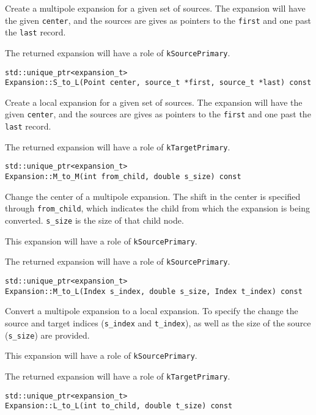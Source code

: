 Create a multipole expansion for a given set of sources. The expansion will
have the given \texttt{center}, and the sources are gives as pointers to the
\texttt{first} and one past the \texttt{last} record.

The returned expansion will have a role of \texttt{kSourcePrimary}.

\begin{lstlisting}
std::unique_ptr<expansion_t> 
Expansion::S_to_L(Point center, source_t *first, source_t *last) const
\end{lstlisting}

Create a local expansion for a given set of sources. The expansion will
have the given \texttt{center}, and the sources are gives as pointers to the
\texttt{first} and one past the \texttt{last} record.

The returned expansion will have a role of \texttt{kTargetPrimary}.

\begin{lstlisting}
std::unique_ptr<expansion_t> 
Expansion::M_to_M(int from_child, double s_size) const
\end{lstlisting}

Change the center of a multipole expansion. The shift in the center is
specified through \texttt{from\_child}, which indicates the child from which
the expansion is being converted. \texttt{s\_size} is the size of that child
node.

This expansion will have a role of \texttt{kSourcePrimary}.

The returned expansion will have a role of \texttt{kSourcePrimary}.

\begin{lstlisting}
std::unique_ptr<expansion_t> 
Expansion::M_to_L(Index s_index, double s_size, Index t_index) const
\end{lstlisting}

Convert a multipole expansion to a local expansion. To specify the change the
source and target indices (\texttt{s\_index} and \texttt{t\_index}), as well
as the size of the source (\texttt{s\_size}) are provided.

This expansion will have a role of \texttt{kSourcePrimary}.

The returned expansion will have a role of \texttt{kTargetPrimary}.

\begin{lstlisting}
std::unique_ptr<expansion_t> 
Expansion::L_to_L(int to_child, double t_size) const
\end{lstlisting}

